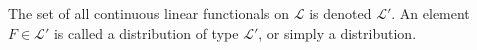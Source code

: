 The set of all continuous linear functionals on $\mathcal{L}$ is denoted $\mathcal{L}'$. An element $F \in \mathcal{L}'$ is called a distribution of type $\mathcal{L}'$, or simply a distribution.
